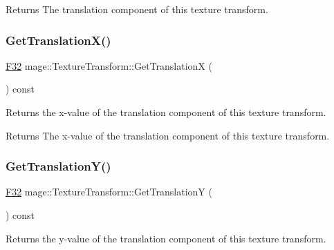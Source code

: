 \begin{DoxyReturn}{Returns}
The translation component of this texture transform. 
\end{DoxyReturn}
\hypertarget{classmage_1_1_texture_transform_a94d51c47a75024fadfd849fc45e5268d}{}\label{classmage_1_1_texture_transform_a94d51c47a75024fadfd849fc45e5268d} 
\subsubsection{\texorpdfstring{Get\+Translation\+X()}{GetTranslationX()}}
{\footnotesize\ttfamily \hyperlink{namespacemage_aa97e833b45f06d60a0a9c4fc22ae02c0}{F32} mage\+::\+Texture\+Transform\+::\+Get\+TranslationX (\begin{DoxyParamCaption}{ }\end{DoxyParamCaption}) const\hspace{0.3cm}{\ttfamily [noexcept]}}

Returns the x-\/value of the translation component of this texture transform.

\begin{DoxyReturn}{Returns}
The x-\/value of the translation component of this texture transform. 
\end{DoxyReturn}
\hypertarget{classmage_1_1_texture_transform_a55bb63ee1f43af0208074fd876ba8d74}{}\label{classmage_1_1_texture_transform_a55bb63ee1f43af0208074fd876ba8d74} 
\subsubsection{\texorpdfstring{Get\+Translation\+Y()}{GetTranslationY()}}
{\footnotesize\ttfamily \hyperlink{namespacemage_aa97e833b45f06d60a0a9c4fc22ae02c0}{F32} mage\+::\+Texture\+Transform\+::\+Get\+TranslationY (\begin{DoxyParamCaption}{ }\end{DoxyParamCaption}) const\hspace{0.3cm}{\ttfamily [noexcept]}}

Returns the y-\/value of the translation component of this texture transform.

